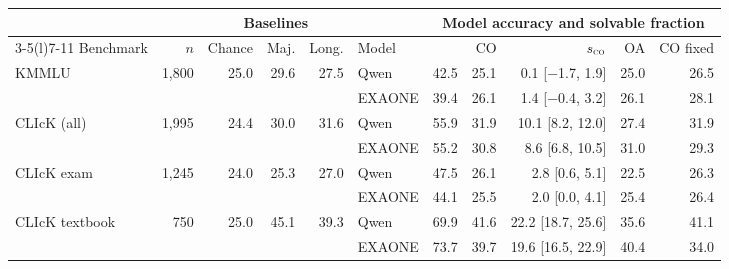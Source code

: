 \begin{tabular}{@{}lrrrrlrrrrr@{}}
\toprule
 & & \multicolumn{3}{c}{Baselines} & & \multicolumn{5}{c}{Model accuracy and solvable fraction} \\
\cmidrule(lr){3-5}\cmidrule(l){7-11}
Benchmark & $n$ & Chance & Maj. & Long. & Model & \full{} & \textsc{CO} & $s_{\textsc{co}}$ & \textsc{OA} & \textsc{CO} fixed \\
\midrule
\multirow{2}{*}{KMMLU} & \multirow{2}{*}{1,800} & \multirow{2}{*}{25.0} & \multirow{2}{*}{29.6} & \multirow{2}{*}{27.5} & Qwen & 42.5 & 25.1 & 0.1 {\scriptsize[$-$1.7, 1.9]} & 25.0 & 26.5 \\
 & & & &  & EXAONE & 39.4 & 26.1 & 1.4 {\scriptsize[$-$0.4, 3.2]} & 26.1 & 28.1 \\
\midrule
\multirow{2}{*}{CLIcK (all)} & \multirow{2}{*}{1,995} & \multirow{2}{*}{24.4} & \multirow{2}{*}{30.0} & \multirow{2}{*}{31.6} & Qwen & 55.9 & 31.9 & 10.1 {\scriptsize[8.2, 12.0]} & 27.4 & 31.9 \\
 & & & &  & EXAONE & 55.2 & 30.8 & 8.6 {\scriptsize[6.8, 10.5]} & 31.0 & 29.3 \\
\midrule
\multirow{2}{*}{CLIcK exam} & \multirow{2}{*}{1,245} & \multirow{2}{*}{24.0} & \multirow{2}{*}{25.3} & \multirow{2}{*}{27.0} & Qwen & 47.5 & 26.1 & 2.8 {\scriptsize[0.6, 5.1]} & 22.5 & 26.3 \\
 & & & &  & EXAONE & 44.1 & 25.5 & 2.0 {\scriptsize[0.0, 4.1]} & 25.4 & 26.4 \\
\midrule
\multirow{2}{*}{CLIcK textbook} & \multirow{2}{*}{750} & \multirow{2}{*}{25.0} & \multirow{2}{*}{45.1} & \multirow{2}{*}{39.3} & Qwen & 69.9 & 41.6 & 22.2 {\scriptsize[18.7, 25.6]} & 35.6 & 41.1 \\
 & & & &  & EXAONE & 73.7 & 39.7 & 19.6 {\scriptsize[16.5, 22.9]} & 40.4 & 34.0 \\
\bottomrule
\end{tabular}
